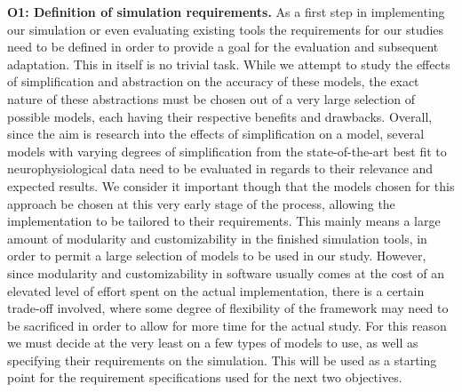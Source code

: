 \documentclass[a4paper,11pt]{article}
\begin{document}
\textbf{O1: Definition of simulation requirements.}
As a first step in implementing our simulation or even evaluating existing tools the requirements for our studies need to be defined in order to provide a goal for the evaluation and subsequent adaptation. This in itself is no trivial task. While we attempt to study the effects of simplification and abstraction on the accuracy of these models, the exact nature of these abstractions must be chosen out of a very large selection of possible models, each having their respective benefits and drawbacks. 
Overall, since the aim is research into the effects of simplification on a model, several models with varying degrees of simplification from the state-of-the-art best fit to neurophysiological data need to be evaluated in regards to their relevance and expected results.
We consider it important though that the models chosen for this approach be chosen at this very early stage of the process, allowing the implementation to be tailored to their requirements. This mainly means a large amount of modularity and customizability in the finished simulation tools, in order to permit a large selection of models to be used in our study. However, since modularity and customizability in software usually comes at the cost of an elevated level of effort spent on the actual implementation, there is a certain trade-off involved, where some degree of flexibility of the framework may need to be sacrificed in order to allow for more time for the actual study.
For this reason we must decide at the very least on a few types of models to use, as well as specifying their requirements on the simulation. This will be used as a starting point for the requirement specifications used for the next two objectives.
\\[0.2cm]
\end{document}
